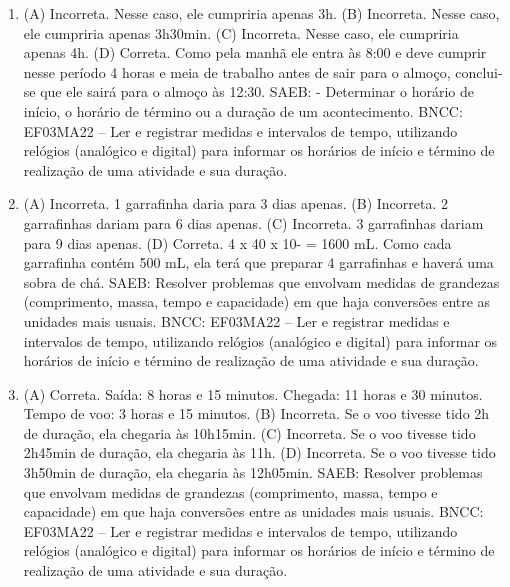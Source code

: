 
\begin{enumerate}
\item
(A) Incorreta. Nesse caso, ele cumpriria apenas 3h.
(B) Incorreta. Nesse caso, ele cumpriria apenas 3h30min.
(C) Incorreta. Nesse caso, ele cumpriria apenas 4h.
(D) Correta. Como pela manhã ele entra às 8:00 e deve cumprir nesse período 4 horas e
meia de trabalho antes de sair para o almoço, conclui-se que ele sairá para o almoço às 12:30.
SAEB: - Determinar o horário de início, o horário de término ou a duração de um acontecimento. 
BNCC: EF03MA22 -- Ler e registrar medidas e intervalos de tempo, utilizando relógios (analógico e
digital) para informar os horários de início e término de realização de uma atividade e sua
duração.

\item
(A) Incorreta. 1 garrafinha daria para 3 dias apenas.
(B) Incorreta. 2 garrafinhas dariam para 6 dias apenas.
(C) Incorreta. 3 garrafinhas dariam para 9 dias apenas.
(D) Correta. 4 x 40 x 10- = 1600 mL. Como cada garrafinha contém 500 mL, ela terá que
preparar 4 garrafinhas e haverá uma sobra de chá.
SAEB: Resolver problemas que envolvam medidas de grandezas (comprimento, massa, tempo e capacidade) em que haja conversões entre as unidades mais usuais. 
BNCC: EF03MA22 -- Ler e registrar medidas e intervalos de tempo, utilizando relógios (analógico e
digital) para informar os horários de início e término de realização de uma atividade e sua
duração.

\item
(A) Correta. Saída: 8 horas e 15 minutos. Chegada: 11 horas e 30 minutos. Tempo de voo: 3 horas e 15 minutos.
(B) Incorreta. Se o voo tivesse tido 2h de duração, ela chegaria às 10h15min.
(C) Incorreta. Se o voo tivesse tido 2h45min de duração, ela chegaria às 11h.
(D) Incorreta. Se o voo tivesse tido 3h50min de duração, ela chegaria às 12h05min.
SAEB: Resolver problemas que envolvam medidas de grandezas (comprimento, massa, tempo e capacidade) em que haja conversões entre as unidades mais usuais. 
BNCC: EF03MA22 -- Ler e registrar medidas e intervalos de tempo, utilizando relógios (analógico e
digital) para informar os horários de início e término de realização de uma atividade e sua
duração.
\end{enumerate}


